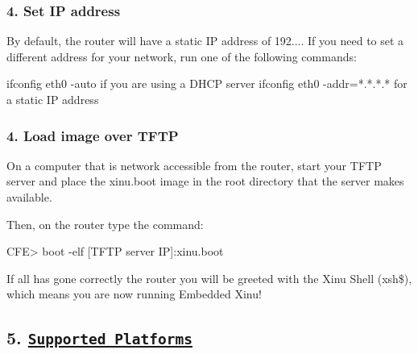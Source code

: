 \subsubsection*{4. Set I\-P address}

By default, the router will have a static I\-P address of 192.... If you need to set a different address for your network, run one of the following commands\-: \begin{DoxyVerb}ifconfig eth0 -auto                      if you are using a DHCP server
ifconfig eth0 -addr=*.*.*.*              for a static IP address
\end{DoxyVerb}


\subsubsection*{4. Load image over T\-F\-T\-P}

On a computer that is network accessible from the router, start your T\-F\-T\-P server and place the xinu.\-boot image in the root directory that the server makes available.

Then, on the router type the command\-: \begin{DoxyVerb}CFE> boot -elf [TFTP server IP]:xinu.boot
\end{DoxyVerb}


If all has gone correctly the router you will be greeted with the Xinu Shell ({\ttfamily xsh\$}), which means you are now running Embedded Xinu!

\subsection*{5. \href{http://xinu.mscs.mu.edu/List_of_supported_platforms}{\tt Supported Platforms}}

